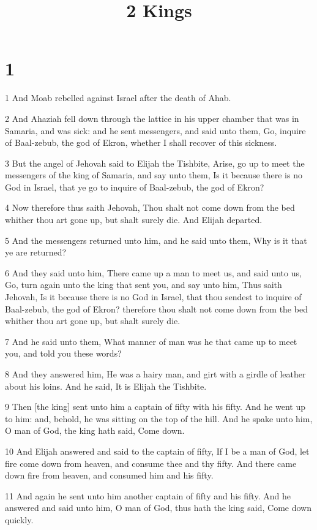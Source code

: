 

\title{2 Kings}

\chapter{1}

\par 1 And Moab rebelled against Israel after the death of Ahab.
\par 2 And Ahaziah fell down through the lattice in his upper chamber that was in Samaria, and was sick: and he sent messengers, and said unto them, Go, inquire of Baal-zebub, the god of Ekron, whether I shall recover of this sickness.
\par 3 But the angel of Jehovah said to Elijah the Tishbite, Arise, go up to meet the messengers of the king of Samaria, and say unto them, Is it because there is no God in Israel, that ye go to inquire of Baal-zebub, the god of Ekron?
\par 4 Now therefore thus saith Jehovah, Thou shalt not come down from the bed whither thou art gone up, but shalt surely die. And Elijah departed.
\par 5 And the messengers returned unto him, and he said unto them, Why is it that ye are returned?
\par 6 And they said unto him, There came up a man to meet us, and said unto us, Go, turn again unto the king that sent you, and say unto him, Thus saith Jehovah, Is it because there is no God in Israel, that thou sendest to inquire of Baal-zebub, the god of Ekron? therefore thou shalt not come down from the bed whither thou art gone up, but shalt surely die.
\par 7 And he said unto them, What manner of man was he that came up to meet you, and told you these words?
\par 8 And they answered him, He was a hairy man, and girt with a girdle of leather about his loins. And he said, It is Elijah the Tishbite.
\par 9 Then [the king] sent unto him a captain of fifty with his fifty. And he went up to him: and, behold, he was sitting on the top of the hill. And he spake unto him, O man of God, the king hath said, Come down.
\par 10 And Elijah answered and said to the captain of fifty, If I be a man of God, let fire come down from heaven, and consume thee and thy fifty. And there came down fire from heaven, and consumed him and his fifty.
\par 11 And again he sent unto him another captain of fifty and his fifty. And he answered and said unto him, O man of God, thus hath the king said, Come down quickly.
